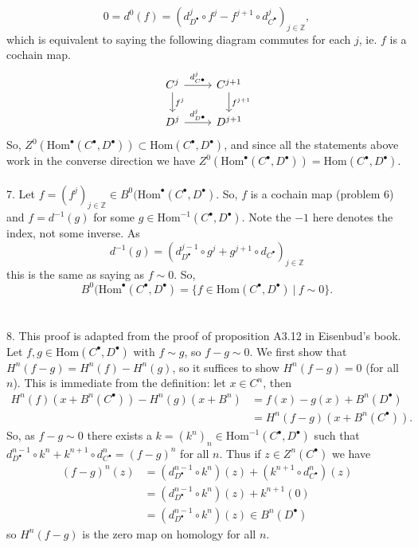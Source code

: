 \documentclass{article}
\newcommand{\Z}{\mathbb{Z}}
\newcommand{\Hom}{\text{Hom}}
\begin{document}
\[
0 = d^0(f) = (d_{D^{\bullet}}^j \circ f^j - f^{j+1} \circ d_{C^{\bullet}}^j)_{j\in \Z},
\]
which is equivalent to saying the following diagram commutes for each $j$, ie. $f$ is a cochain map. 
\[
\begin{tikzcd}
C^j \ar[d, "f^j"] \ar[r, "d_{C^{\bullet}}^j"] &C^{j+1} \ar[d, "f^{j+1}"] \\ D^j \ar[r, "d_{D^{\bullet}}^j"] &D^{j+1}
\end{tikzcd}
\]
So, $Z^0(\Hom^{\bullet}(C^{\bullet}, D^{\bullet})) \subset \Hom(C^{\bullet}, D^{\bullet})$, and since all the statements above work in the converse direction we have $Z^0(\Hom^{\bullet}(C^{\bullet}, D^{\bullet})) = \Hom(C^{\bullet}, D^{\bullet})$.
\\ \\
7. Let $f = (f^j)_{j\in \Z} \in B^0(\Hom^{\bullet}(C^{\bullet}, D^{\bullet})$. So, $f$ is a cochain map (problem 6) and $f = d^{-1}(g)$ for some $g \in \Hom^{-1}(C^{\bullet}, D^{\bullet})$. Note the $-1$ here denotes the index, not some inverse. 
As 
\[
d^{-1}(g) = (d_{D^{\bullet}}^{j-1} \circ g^j + g^{j+1}\circ d_{C^{\bullet}})_{j\in \Z}
\]
this is the same as saying as $f \sim 0$. So, 
\[
B^0(\Hom^{\bullet}(C^{\bullet}, D^{\bullet}) = \{ f \in \Hom(C^{\bullet}, D^{\bullet}) \: | \: f \sim 0 \}.
\]
\\ \\
8. This proof is adapted from the proof of proposition A3.12 in Eisenbud's book. Let $f,g \in \Hom(C^{\bullet}, D^{\bullet})$ with $f \sim g$, so $f-g \sim 0$. We first show that $H^n(f-g) = H^n(f) - H^n(g)$, so it suffices to show $H^n(f-g) = 0$ (for all $n$). This is immediate from the definition: let $x\in C^n$, then 
\begin{align*}
H^n(f)(x+B^n(C^{\bullet})) - H^n(g)(x+B^n) &= f(x) - g(x) + B^n(D^{\bullet}) \\ &= H^n(f-g)(x+B^n(C^{\bullet})).
\end{align*}
So, as $f-g \sim 0$ there exists a $k = (k^n)_n \in \Hom^{-1}(C^{\bullet}, D^{\bullet})$ such that $d_{D^{\bullet}}^{n-1} \circ k^n + k^{n+1}\circ d_{C^{\bullet}}^n = (f-g)^n$ for all $n$. Thus if $z \in Z^n(C^{\bullet})$ we have 
\begin{align*}
    (f-g)^n(z) &= (d^{n-1}_{D^{\bullet}} \circ k^n)(z) + (k^{n+1} \circ d_{C^{\bullet}}^n)(z) \\
    &= (d_{D^{\bullet}}^{n-1}\circ k^n)(z) + k^{n+1}(0) \\
    &= (d^{n-1}_{D^{\bullet}} \circ k^n)(z) \in B^n(D^{\bullet})
\end{align*}
so $H^n(f-g)$ is the zero map on homology for all $n$.
\end{document}
